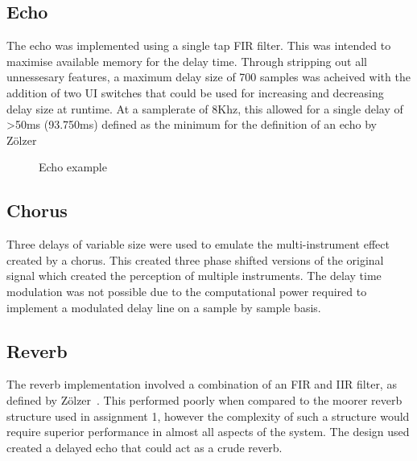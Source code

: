 \documentclass[titlepage]{scrartcl}
\begin{document}
    \subsection{Echo}
    The echo was implemented using a single tap FIR filter. This was intended
    to maximise available memory for the delay time. Through stripping out all
    unnessesary features, a maximum delay size of 700 samples was acheived with
    the addition of two UI switches that could be used for increasing and
    decreasing delay size at runtime.  At a samplerate of 8Khz, this allowed
    for a single delay of \textgreater50ms (93.750ms) defined as the minimum
    for the definition of an echo
    by Z{\"o}lzer~\citeyearpar[p.]{zolzer2011dafx}

    \begin{figure}[H]
        \caption{Echo example}
    \end{figure}

    \subsection{Chorus}
    Three delays of variable size were used to emulate the multi-instrument
    effect created by a chorus. This created three phase shifted versions of
    the original signal which created the perception of multiple instruments.
    The delay time modulation was not possible due to the computational power
    required to implement a modulated delay line on a sample by sample basis.

    \subsection{Reverb}
    The reverb implementation involved a combination of an FIR and IIR filter,
    as defined by Z{\"o}lzer~\citeyearpar{zolzer2011dafx}. This performed
    poorly when compared to the moorer reverb structure used in assignment 1,
    however the complexity of such a structure would require superior
    performance in almost all aspects of the system.
    The design used created a delayed echo that could act as a crude reverb.
\end{document}
